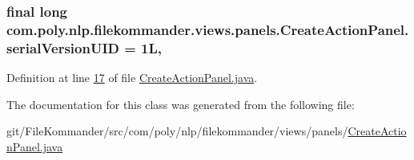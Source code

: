 \hypertarget{classcom_1_1poly_1_1nlp_1_1filekommander_1_1views_1_1panels_1_1_create_action_panel_a23448414807322c40b1b403229052539}{
\subsubsection[{serial\-Version\-U\-I\-D}]{\setlength{\rightskip}{0pt plus 5cm}final long com.\-poly.\-nlp.\-filekommander.\-views.\-panels.\-Create\-Action\-Panel.\-serial\-Version\-U\-I\-D = 1\-L\hspace{0.3cm}{\ttfamily [static]}, {\ttfamily [private]}}}\label{classcom_1_1poly_1_1nlp_1_1filekommander_1_1views_1_1panels_1_1_create_action_panel_a23448414807322c40b1b403229052539}


Definition at line \hyperlink{L17}{17} of file \hyperlink{}{Create\-Action\-Panel.\-java}.



The documentation for this class was generated from the following file\-:\begin{DoxyCompactItemize}
\item 
git/\-File\-Kommander/src/com/poly/nlp/filekommander/views/panels/\hyperlink{_create_action_panel_8java}{Create\-Action\-Panel.\-java}\end{DoxyCompactItemize}
